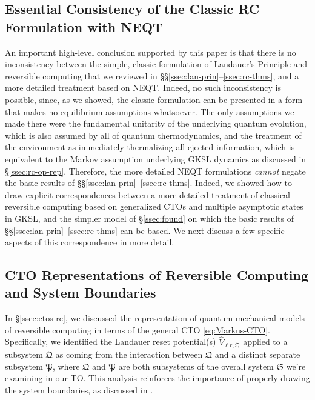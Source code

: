 \documentclass[preprints,article,accept,moreauthors,pdftex]{Definitions/mdpi}
\begin{document}
\begin{paracol}{2}
\subsection{Essential Consistency of the Classic RC Formulation with NEQT}
\label{ssec:consis}
An important high-level conclusion supported by this paper is that there is no inconsistency between the simple, classic formulation of Landauer's Principle and reversible computing that we reviewed in \S\S\ref{ssec:lan-prin}--\ref{ssec:rc-thms}, and a more detailed treatment based on NEQT.  Indeed, no such inconsistency is possible, since, as we showed, the classic formulation can be presented in a form that makes no equilibrium assumptions whatsoever. The only assumptions we made there were the fundamental unitarity of the underlying quantum evolution, which is also assumed by all of quantum thermodynamics, and the treatment of the environment as immediately thermalizing all ejected information, which is equivalent to the Markov assumption underlying GKSL dynamics as discussed in \S\ref{ssec:rc-op-rep}. Therefore, the more detailed NEQT formulations \textit{cannot} negate the basic results of \S\S\ref{ssec:lan-prin}--\ref{ssec:rc-thms}. Indeed, we showed how to draw explicit correspondences between a more detailed treatment of classical reversible computing based on generalized CTOs and multiple asymptotic states in GKSL, and the simpler model of \S\ref{ssec:found} on which the basic results of \S\S\ref{ssec:lan-prin}--\ref{ssec:rc-thms} can be based.  We next discuss a few specific aspects of this correspondence in more detail.

\subsection{CTO Representations of Reversible Computing and System Boundaries}
\label{ssec:cto-rc-sys}
In \S\ref{ssec:ctos-rc}, we discussed the representation of quantum mechanical models of reversible computing in terms of the general CTO \eqref{eq:Markus-CTO}. Specifically, we identified the Landauer reset potential(s) $\widehat{V}_{\ell r,\mathfrak{Q}}$ applied to a subsystem $\mathfrak{Q}$ as coming from the interaction between $\mathfrak{Q}$ and a distinct separate subsystem $\mathfrak{P}$, where $\mathfrak{Q}$ and $\mathfrak{P}$ are both subsystems of the overall system $\mathfrak{S}$ we're examining in our TO. This analysis reinforces the importance of properly drawing the system boundaries, as discussed in \cite{Anderson19}.


\end{paracol}
\end{document}
